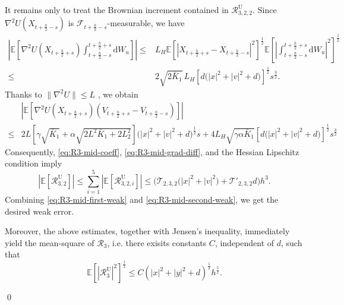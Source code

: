 \documentclass[12pt]{article}
\newenvironment{redtext}
  {\color{black}\ignorespaces}
  {\ignorespacesafterend}
\numberwithin{equation}{section}
\renewenvironment{proof}%
  {\begin{trivlist}%
   \item[]\ignorespaces}%
  {\qed\end{trivlist}}
\newcommand{\E}{\mathbb{E}}
\newcommand{\dd}{\mathrm{d}}
\begin{document}
\begin{redtext}
\begin{proof}
It remains only to treat the Brownian increment contained in \(\mathcal R^{\mathrm{U}}_{3,2,2}\).
Since \(\nabla^2U(X_{t+\frac h2-s})\) is
\(\mathcal F_{t+\frac h2-s}\)-measurable, we have
\begin{equation}
\begin{aligned}
\left|
\E\left[
\nabla^2U(X_{t+\frac h2+s})
\int^{t+\frac{h}{2}+s}_{t+\frac{h}{2}-s}\dd W_u
\right]
\right|
\leq&
L_H
\E\left[\left|X_{t+\frac h2+s}-X_{t+\frac h2-s}\right|^2\right]^{\frac12}
\E\left[\left|\int^{t+\frac{h}{2}+s}_{t+\frac{h}{2}-s}\dd W_u\right|^2\right]^{\frac12}
\\
\leq&
2\sqrt{2\bar K_1}\,L_H
\left[d\bigl(|x|^2+|v|^2+d\bigr)\right]^{\frac12}s^{\frac32}.
\end{aligned}
\end{equation}
Thanks to
\(\|\nabla^2U\|\leq L\)
, we obtain
\begin{equation}
\begin{aligned}
&\left|
\E\left[
\nabla^2U(X_{t+\frac h2+s})
\left(V_{t+\frac h2+s}-V_{t+\frac h2-s}\right)
\right]
\right|
\\
\leq&
2L\left[
\gamma\sqrt{\bar K_1}
+\alpha\sqrt{2L^2\bar K_1+2L_2^2}
\right]
\bigl(|x|^2+|v|^2+d\bigr)^{\frac12}s
+
4L_H\sqrt{\gamma\alpha\bar K_1}
\left[d\bigl(|x|^2+|v|^2+d\bigr)\right]^{\frac12}s^{\frac32}
\end{aligned}
\end{equation}
Consequently, \eqref{eq:R3-mid-coeff}, \eqref{eq:R3-mid-grad-diff}, and the Hessian Lipschitz condition imply
\begin{equation}
|\E[\mathcal R^{\mathrm{U}}_{3,2}]|
\leq
\sum_{i=1}^5|\E[\mathcal R^{\mathrm{U}}_{3,2,i}]|
\leq
\Big(\mathcal T_{2,3,2}\bigl(|x|^2+|v|^2\bigr)
+
\mathcal T'_{2,3,2}d
\Big)h^3.
\label{eq:R3-mid-second-weak}
\end{equation}
Combining \eqref{eq:R3-mid-first-weak} and \eqref{eq:R3-mid-second-weak}, we get the desired weak error.

Moreover, the above estimates, together with Jensen's inequality, immediately yield the mean-square of $\mathcal R_3$, i.e. there exisits constants $C$, independent of $d$, such that
\begin{equation}
\mathbb E[|\mathcal R^{\mathrm{U}}_3|^2]^{\frac{1}{2}}
\leq
C(|x|^2+|y|^2+d)^{\frac{1}{2}}h^{\frac{5}{2}}.
\end{equation}


\end{proof}
\end{redtext}
\end{document}
